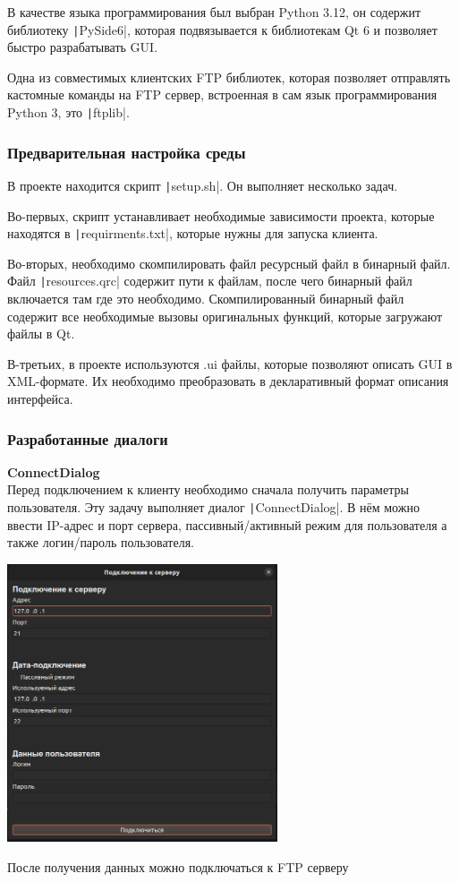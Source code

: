 \documentclass[a4paper,14pt]{extarticle}
\begin{document}
В качестве языка программирования был выбран Python 3.12, он содержит библиотеку \texttt|PySide6|, которая
подвязывается к библиотекам Qt 6 и позволяет быстро разрабатывать GUI. 

Одна из совместимых клиентских FTP библиотек, которая позволяет отправлять 
кастомные команды на FTP сервер, встроенная в сам язык программирования
Python 3, это \texttt|ftplib|.

\subsubsection{Предварительная настройка среды}
В проекте находится скрипт \texttt|setup.sh|. Он выполняет несколько задач. 

Во-первых, скрипт устанавливает необходимые зависимости проекта, которые находятся в \texttt|requirments.txt|, 
которые нужны для запуска клиента. 

Во-вторых, необходимо скомпилировать файл ресурсный файл в бинарный файл. Файл \texttt|resources.qrc| содержит
пути к файлам, после чего бинарный файл включается там где это необходимо. Скомпилированный бинарный файл 
содержит все необходимые вызовы оригинальных функций, которые загружают файлы в Qt. 

В-третьих, в проекте используются .ui файлы, которые позволяют описать GUI в XML-формате. Их необходимо
преобразовать в декларативный формат описания интерфейса. 

\subsubsection{Разработанные диалоги}
\textbf{ConnectDialog}\\
Перед подключением к клиенту необходимо сначала получить параметры пользователя. 
Эту задачу выполняет диалог \texttt|ConnectDialog|. В нём можно 
ввести IP-адрес и порт сервера, пассивный/активный режим для пользователя а 
также логин/пароль пользователя.\\
\begin{center}
\includegraphics[width=80mm]{connect_dialog}
\end{center}
После получения данных можно подключаться к FTP серверу
\end{document}

